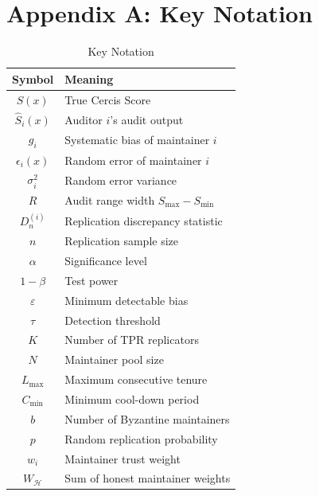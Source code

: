 \documentclass[11pt,a4paper]{article}
\theoremstyle{definition}
\begin{document}
\section*{Appendix A: Key Notation}

\begin{table}[htbp]
\centering
\caption{Key Notation}
\label{tab:notation}
\begin{tabular}{@{}cl@{}}
\toprule
\textbf{Symbol} & \textbf{Meaning} \\
\midrule
$S(x)$ & True Cercis Score \\
$\hat{S}_i(x)$ & Auditor $i$'s audit output \\
$g_i$ & Systematic bias of maintainer $i$ \\
$\epsilon_i(x)$ & Random error of maintainer $i$ \\
$\sigma_i^2$ & Random error variance \\
$R$ & Audit range width $S_{\max}-S_{\min}$ \\
$D_n^{(i)}$ & Replication discrepancy statistic \\
$n$ & Replication sample size \\
$\alpha$ & Significance level \\
$1-\beta$ & Test power \\
$\varepsilon$ & Minimum detectable bias \\
$\tau$ & Detection threshold \\
$K$ & Number of TPR replicators \\
$N$ & Maintainer pool size \\
$L_{\max}$ & Maximum consecutive tenure \\
$C_{\min}$ & Minimum cool-down period \\
$b$ & Number of Byzantine maintainers \\
$p$ & Random replication probability \\
$w_i$ & Maintainer trust weight \\
$W_{\mathcal{H}}$ & Sum of honest maintainer weights \\
\bottomrule
\end{tabular}
\end{table}

\end{document}
